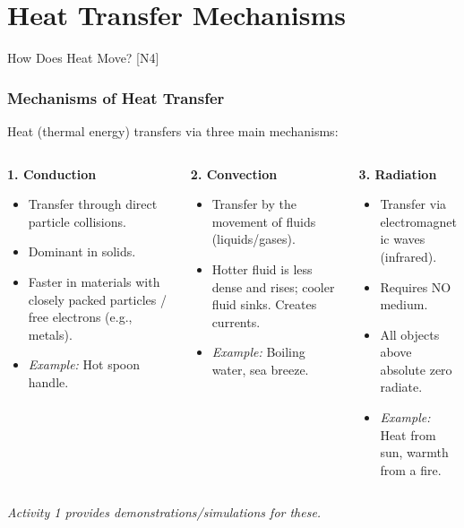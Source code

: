 \documentclass[xcolor=svgnames]{beamer}
\begin{document}
\section{Heat Transfer Mechanisms}
\begin{frame}{How Does Heat Move? [N4]}
    \frametitle{Mechanisms of Heat Transfer}
    Heat (thermal energy) transfers via three main mechanisms:
    \vspace{1em}

    \begin{columns}[T] %
        \begin{column}{0.33\textwidth}
            \textbf{1. Conduction}
            \begin{itemize}
                \item Transfer through direct particle collisions.
                \item Dominant in solids.
                \item Faster in materials with closely packed particles / free electrons (e.g., metals).
                \item \textit{Example:} Hot spoon handle.
            \end{itemize}
        \end{column}
        \begin{column}{0.33\textwidth}
            \textbf{2. Convection}
            \begin{itemize}
                \item Transfer by the movement of fluids (liquids/gases).
                \item Hotter fluid is less dense and rises; cooler fluid sinks. Creates currents.
                \item \textit{Example:} Boiling water, sea breeze.
            \end{itemize}
        \end{column}
        \begin{column}{0.33\textwidth}
            \textbf{3. Radiation}
            \begin{itemize}
                \item Transfer via electromagnetic waves (infrared).
                \item Requires NO medium.
                \item All objects above absolute zero radiate.
                \item \textit{Example:} Heat from sun, warmth from a fire.
            \end{itemize}
        \end{column}
    \end{columns}
    \vspace{1em}
    \textit{Activity 1 provides demonstrations/simulations for these.}
\end{frame}
\end{document}
